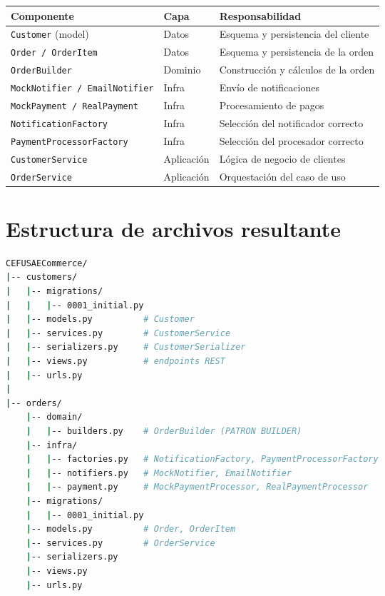\documentclass[12pt, a4paper]{article}
\begin{document}
\begin{center}
\begin{tabular}{@{}p{3.5cm}p{4cm}p{5.5cm}@{}}
    \toprule
    \textbf{Componente} & \textbf{Capa} & \textbf{Responsabilidad} \\
    \midrule
    \texttt{Customer} (model) & Datos & Esquema y persistencia del cliente \\
    \texttt{Order / OrderItem} & Datos & Esquema y persistencia de la orden \\
    \texttt{OrderBuilder} & Dominio & Construcción y cálculos de la orden \\
    \texttt{MockNotifier / EmailNotifier} & Infra & Envío de notificaciones \\
    \texttt{MockPayment / RealPayment} & Infra & Procesamiento de pagos \\
    \texttt{NotificationFactory} & Infra & Selección del notificador correcto \\
    \texttt{PaymentProcessorFactory} & Infra & Selección del procesador correcto \\
    \texttt{CustomerService} & Aplicación & Lógica de negocio de clientes \\
    \texttt{OrderService} & Aplicación & Orquestación del caso de uso \\
    \bottomrule
\end{tabular}
\end{center}

\newpage
\section{Estructura de archivos resultante}

\begin{lstlisting}[language=bash, style=python, caption={Árbol de archivos de ambas apps}]
CEFUSAECommerce/
|-- customers/
|   |-- migrations/
|   |   |-- 0001_initial.py
|   |-- models.py          # Customer
|   |-- services.py        # CustomerService
|   |-- serializers.py     # CustomerSerializer
|   |-- views.py           # endpoints REST
|   |-- urls.py
|
|-- orders/
    |-- domain/
    |   |-- builders.py    # OrderBuilder (PATRON BUILDER)
    |-- infra/
    |   |-- factories.py   # NotificationFactory, PaymentProcessorFactory
    |   |-- notifiers.py   # MockNotifier, EmailNotifier
    |   |-- payment.py     # MockPaymentProcessor, RealPaymentProcessor
    |-- migrations/
    |   |-- 0001_initial.py
    |-- models.py          # Order, OrderItem
    |-- services.py        # OrderService
    |-- serializers.py
    |-- views.py
    |-- urls.py
\end{lstlisting}
\end{document}
